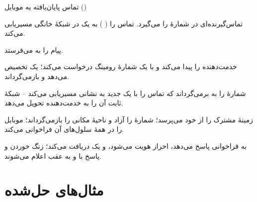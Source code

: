 \documentclass[11pt,a4paper]{article}
\begin{document}
\begin{acnfigure}
  \caption{تماس آغازشده از موبایل (\cref{proc:moc}).}
  \label{fig:moc}
\end{acnfigure}

\begin{procedurebox}{تماس پایان‌یافته به موبایل ()}\label{proc:mtc}
\begin{steps}
  \item تماس‌گیرنده‌ای در  شمارهٔ  را می‌گیرد.  تماس را
        ( ) به یک  در شبکهٔ خانگی مسیریابی می‌کند.
  \item {} پیام   را به  می‌فرستد.
  \item {}  خدمت‌دهنده را پیدا می‌کند و با  
        یک شمارهٔ رومینگ درخواست می‌کند؛  یک  تخصیص می‌دهد و بازمی‌گرداند.
  \item {} شمارهٔ  را به  برمی‌گرداند که تماس را با یک 
        جدید به نشانی  مسیریابی می‌کند -- شبکهٔ ثابت آن را به  خدمت‌دهنده
        تحویل می‌دهد.
  \item {} زمینهٔ مشترک را از  خود می‌پرسد؛  شمارهٔ  را آزاد
        و ناحیهٔ مکانی را بازمی‌گرداند؛  موبایل را در همهٔ سلول‌های آن  فراخوانی می‌کند.
  \item {} به فراخوانی پاسخ می‌دهد، احراز هویت می‌شود،  و یک  دریافت
        می‌کند؛ زنگ خوردن و پاسخ با  و  به عقب اعلام می‌شوند.
\end{steps}
\end{procedurebox}

\begin{acnfigure}
  \caption{تماس پایان‌یافته به موبایل: پرسش از ، تخصیص ، مسیریابی و فراخوانی
  (\cref{proc:mtc}). خط‌چین: سیگنالینگ؛ توپر: مدار رزروشده.}
  \label{fig:mtc}
\end{acnfigure}

\section{مثال‌های حل‌شده}
\end{document}
